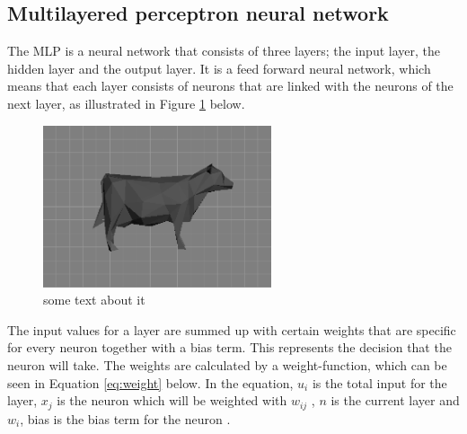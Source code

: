 \documentclass[12pt]{report}
\begin{document}
\subsection*{Multilayered perceptron neural network}

The MLP is a neural network that consists of three layers; the input layer, the hidden layer and the output layer.  It is a feed forward neural network, which means that each layer consists of neurons that are linked with the neurons of the next layer, as illustrated in Figure \ref{fig:layers} below.

\begin{figure}[!ht]
	\centering
	\includegraphics[width=0.6\textwidth]{figure.png}
	\caption{\label{fig:layers} some text about it}
	\centering
\end{figure}
The input values for a layer are summed up with certain weights that are specific for every neuron together with a bias term. This represents the decision that the neuron will take. The weights are calculated by a weight-function, which can be seen in Equation \ref{eq:weight} below. In the equation, $u_i$ is the total input for the layer, $x_j$  is the neuron which will be weighted with $w_{ij}$ , $n$ is the current layer and  $w_i$, bias is the bias term for the neuron \cite{mlp}. 
\end{document}
